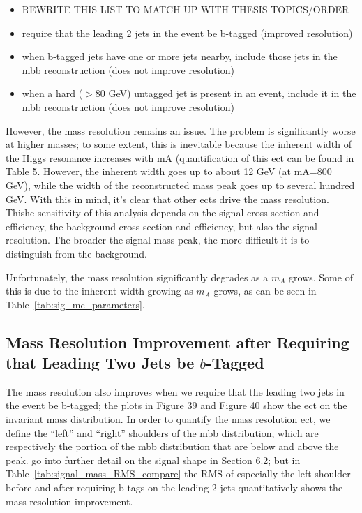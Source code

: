 \begin{itemize}
    \item REWRITE THIS LIST TO MATCH UP WITH THESIS TOPICS/ORDER
    \item require that the leading 2 jets in the event be b-tagged (improved resolution)
    \item when b-tagged jets have one or more jets nearby, include those jets in the mbb reconstruction (does
not improve resolution)
    \item when a hard ($>$80 GeV) untagged jet is present in an event, include it in the mbb reconstruction
(does not improve resolution)
\end{itemize}
However, the mass resolution remains an issue. The problem is significantly worse at higher masses;
to some extent, this is inevitable because the inherent width of the Higgs resonance increases with mA
(quantification of this ect can be found in Table 5. However, the inherent width goes up to about 12
GeV (at mA=800 GeV), while the width of the reconstructed mass peak goes up to several hundred GeV.
With this in mind, it’s clear that other ects drive the mass resolution. Thishe sensitivity of this analysis depends on the signal cross section and efficiency, the background cross section and efficiency, but also the signal resolution.  The broader the signal mass peak, the more difficult it is to distinguish from the background.  

Unfortunately, the mass resolution significantly degrades as a $m_A$ grows.  Some of this is due to the inherent width growing as $m_A$ grows, as can be seen in Table~\ref{tab:sig_mc_parameters}.  

\subsection{Mass Resolution Improvement after Requiring that Leading Two Jets be $b$-Tagged}
The mass resolution also improves when we require that the leading two jets in the event be b-tagged;
 the plots in Figure 39 and Figure 40 show the ect on the invariant mass distribution.
 In order to quantify the mass resolution ect, we define the “left” and “right” shoulders of the mbb
 distribution, which are respectively the portion of the mbb distribution that are below and above the peak.
 go into further detail on the signal shape in Section 6.2; but in Table~\ref{tab:signal_mass_RMS_compare} the RMS of especially the left
 shoulder before and after requiring b-tags on the leading 2 jets quantitatively shows the mass resolution
 improvement.



